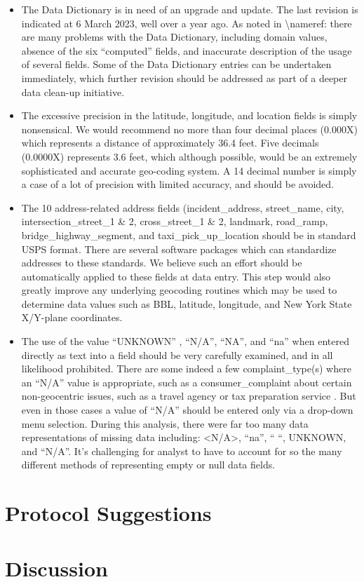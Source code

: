\documentclass[12pt, titlepage]{article}
\begin{document}
\begin{itemize}
	\item The Data Dictionary is in need of an upgrade and update. The last 
	revision is indicated at 6 March 2023, well over a year ago. 	As noted 
	in \textbackslash nameref:  there are many 
	problems with the Data Dictionary, including domain values, absence of 
	the six ``computed'' fields, and inaccurate description of the usage of 
	several fields. Some of the Data Dictionary entries can be undertaken 
	immediately, which further revision should be addressed as part of 
	a deeper data clean-up initiative. 
	
	\item The excessive precision in the latitude, longitude, and location 
	fields is simply nonsensical.  We would recommend no more than 
	four decimal places (0.000X) which represents a distance of approximately 
	36.4 feet. Five decimals (0.0000X) represents 3.6 feet, which although 
	possible, would be an extremely sophisticated and accurate 
	geo-coding system. A 14 decimal number is simply a case of a lot 
	of precision with limited accuracy, and should be avoided.

	\item The 10 address-related address fields (incident\_address, 
	street\_name, city, intersection\_street\_1 \& 2, cross\_street\_1 \& 2,  
	landmark, road\_ramp, bridge\_highway\_segment, and 
	taxi\_pick\_up\_location should be in standard USPS format. There 
	are several software packages which can standardize addresses to 
	these standards. We believe such an effort should be automatically 
	applied to these fields at data entry. This step would also greatly 
	improve any underlying geocoding routines which 	may be used 
	to determine data values such as BBL, latitude, longitude, and New 
	York State X/Y-plane coordinates.
	
	\item The use of the value ``UNKNOWN'' , ``N/A'', ``NA'', and ``na'' when 
	entered directly as text into a field should be very carefully examined, 
	and in all likelihood prohibited.  There are some indeed a few 
	complaint\_type(s) where an ``N/A'' value is appropriate, such 
	as a consumer\_complaint about certain non-geocentric issues, such 
	as a travel agency or tax preparation service . But even in those cases 
	a value of ``N/A'' should be entered only via a drop-down menu 
	selection. During this analysis, there were far too many data 
	representations of missing data including: <N/A>, ``na'', `` ``, UNKNOWN, 
	and ``N/A''. It's challenging for analyst to have to account for so 
	the many different methods of representing empty or null data fields. 
\end{itemize}



\section{Protocol Suggestions} \label{sec:protocol}



\section{Discussion} \label{sec:discussion}



\end{document}
